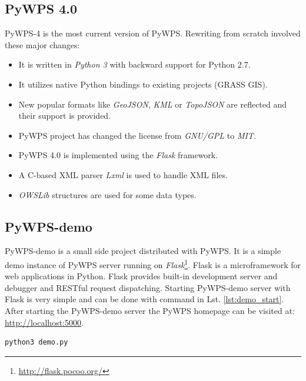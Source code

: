 \subsection{PyWPS 4.0}
\label{sec:PyWPS4}
PyWPS-4 is the most current version of PyWPS. Rewriting from scratch involved these major changes:
\begin{itemize}
\item It is written in \textit{Python 3} with backward support for Python 2.7.
\item It utilizes native Python bindings to existing projects (GRASS GIS).
\item New popular formats like \textit{GeoJSON}, \textit{KML} or \textit{TopoJSON} are reflected and their support is provided.
\item PyWPS project has changed the license from \textit{GNU/GPL} to \textit{MIT}.
\item PyWPS 4.0 is implemented using the \textit{Flask} framework.
\item A C-based XML parser \textit{Lxml} is used to handle XML files.
\item \textit{OWSLib} structures are used for some data types.
\end{itemize}

\subsection{PyWPS-demo}
\label{sub:demo}
PyWPS-demo is a small side project distributed with PyWPS. It is a simple demo instance of PyWPS server running on 
\textit{Flask}\footnote{\url{http://flask.pocoo.org/}}. Flask is a microframework for web applications in Python. 
Flask provides built-in development server and debugger and RESTful request dispatching. Starting PyWPS-demo server with Flask
is very simple and can be done with command in Lst. \ref{lst:demo_start}. After starting the PyWPS-demo server the PyWPS homepage can be 
visited at: \url{http://localhost:5000}.

\bigskip
\begin{lstlisting}[basicstyle=\small,caption={Starting PyWPS-demo server},label={lst:demo_start}]
python3 demo.py
\end{lstlisting}

